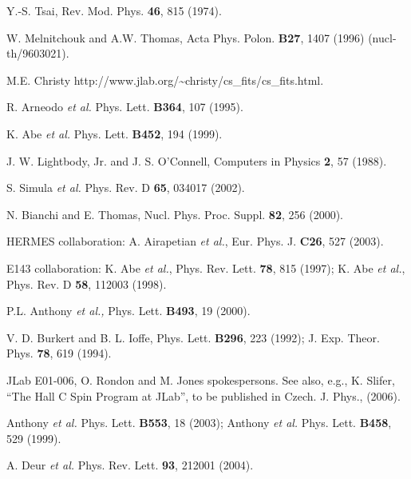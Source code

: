 \documentclass[12pt]{article}
\begin{document}
\begin{thebibliography}{99}
Y.-S. Tsai,
Rev. Mod. Phys. {\bf 46},
815 (1974).


 W. Melnitchouk and A.W. Thomas, Acta Phys. Polon. {\bf B27},
1407 (1996) (nucl-th/9603021).

 M.E. Christy http://www.jlab.org/\textasciitilde{}christy/cs\_fits/cs\_fits.html.

 R. Arneodo {\it et al.} Phys. Lett. {\bf B364}, 107 (1995).%


 K. Abe {\it et al.} Phys. Lett. {\bf B452}, 194 (1999).%

 J. W. Lightbody, Jr. and J. S. O'Connell, Computers in Physics {\bf 2}, 57 (1988).

 S. Simula\emph{ et al.} Phys. Rev. D \textbf{65}, 034017 (2002).

N. Bianchi and E. Thomas, Nucl. Phys. Proc. Suppl. \textbf{82}, 256 (2000).

HERMES collaboration: A. Airapetian \emph{et al.}, 
Eur. Phys. J. {\bf C26}, 527 (2003).

E143 collaboration: K. Abe \emph{et al.},
Phys. Rev. Lett. \textbf{78}, 815 (1997); 
K. Abe \emph{et al.}, 
Phys. Rev. D {\bf58}, 112003 (1998).

P.L. Anthony {\it et al.,} Phys. Lett. {\bf B493}, 19 (2000).

V. D. Burkert and B. L. Ioffe,
Phys. Lett. \textbf{B296}, 223 (1992);
J. Exp. Theor. Phys. {\bf 78}, 619 (1994).

JLab E01-006, O. Rondon and M. Jones spokespersons.
See also, e.g., K. Slifer,  ``The Hall C Spin Program at JLab'',
to be published in  Czech. J. Phys., (2006).

 Anthony {\it et al.} Phys. Lett. {\bf B553}, 18 (2003);
Anthony {\it et al.} Phys. Lett. {\bf B458}, 529 (1999).%

%
 A. Deur {\it et al.} Phys. Rev. Lett.%
{\bf 93}, 212001 (2004).


\end{thebibliography}
\end{document}
